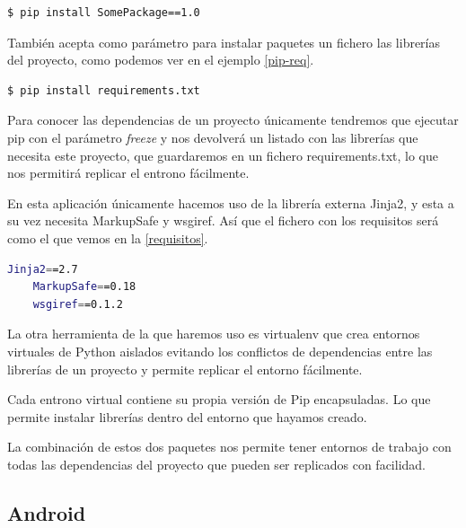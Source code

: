 \begin{lstlisting}[language=bash,label=pip,caption=Instalación de un paquete utilizando pip]
	$ pip install SomePackage==1.0  
\end{lstlisting}

También acepta como parámetro para instalar paquetes un fichero las librerías del proyecto, como podemos ver en el ejemplo \ref{pip-req}.\par

\begin{lstlisting}[language=bash,label=pip-req,caption=Instalación de los requisitos de un proyecto utilizando pip]
	$ pip install requirements.txt  
\end{lstlisting}

Para conocer las dependencias de un proyecto únicamente tendremos que ejecutar pip con el parámetro \emph{freeze} y nos devolverá un listado con las librerías que necesita este proyecto, que guardaremos en un fichero requirements.txt, lo que nos permitirá replicar el entrono fácilmente. \par
En esta aplicación únicamente hacemos uso de la librería externa Jinja2, y esta a su vez necesita MarkupSafe y wsgiref. Así que el fichero con los requisitos será como el que vemos en la \ref{requisitos}.\par

\begin{lstlisting}[language=bash,label=requisitos,caption=Requisitos del proyecto]
	Jinja2==2.7
	MarkupSafe==0.18
	wsgiref==0.1.2
\end{lstlisting}


La otra herramienta de la que haremos uso es virtualenv  que  crea entornos virtuales de Python aislados evitando los conflictos de dependencias entre las librerías de un proyecto y permite replicar el entorno fácilmente.\par
Cada entrono virtual contiene su propia versión de Pip encapsuladas. Lo que permite instalar librerías dentro del entorno que hayamos creado.\medskip\par

La combinación de estos dos paquetes nos permite tener entornos de trabajo con todas las dependencias del proyecto que pueden ser replicados con facilidad. 

\subsection{Android}

